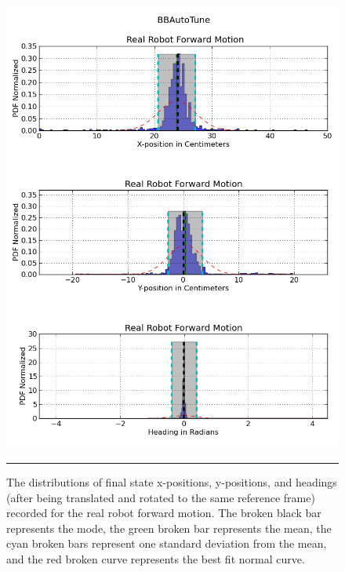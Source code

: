 \begin{figure}[htbp]
\centering
\includegraphics[width=5.5in]{../Figures/Chapter4/real_robot_forward_dist.png}
\rule{35em}{0.5pt}
\caption[Real Robot Forward Motion Distributions]{The distributions of final state x-positions, y-positions, and headings (after being translated and rotated to the same reference frame) recorded for the real robot forward motion. The broken black bar represents the mode, the green broken bar represents the mean, the cyan broken bars represent one standard deviation from the mean, and the red broken curve represents the best fit normal curve.}
\label{fig:real_robot_forward_dist}
\end{figure}

